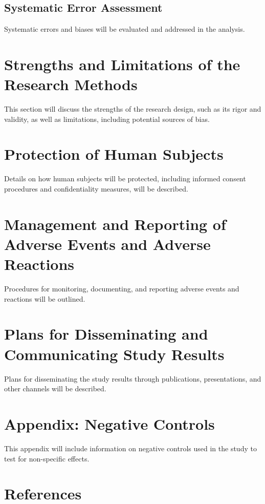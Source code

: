 \documentclass[12pt]{article}
\begin{document}
\subsection{Systematic Error Assessment}
Systematic errors and biases will be evaluated and addressed in the analysis.

\section{Strengths and Limitations of the Research Methods}
\label{strengths-and-limitations}

This section will discuss the strengths of the research design, such as its rigor and validity, as well as limitations, including potential sources of bias.

\section{Protection of Human Subjects}
\label{protection-of-human-subjects}

Details on how human subjects will be protected, including informed consent procedures and confidentiality measures, will be described.

\section{Management and Reporting of Adverse Events and Adverse Reactions}
\label{management-of-adverse-events}

Procedures for monitoring, documenting, and reporting adverse events and reactions will be outlined.

\section{Plans for Disseminating and Communicating Study Results}
\label{dissemination-of-results}

Plans for disseminating the study results through publications, presentations, and other channels will be described.

\section{Appendix: Negative Controls}
\label{appendix-negative-controls}

This appendix will include information on negative controls used in the study to test for non-specific effects.

\section{References}
\label{references}

\printbibliography
\end{document}
